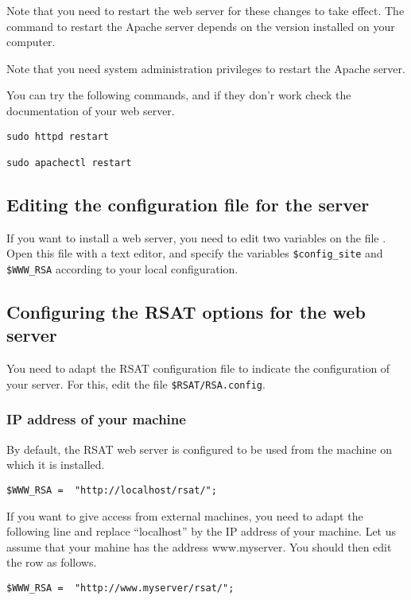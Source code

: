 \documentclass[12pt,a4paper, twoside]{scrreprt} %
\begin{document}
Note that you need to restart the web server for these changes to take
effect. The command to restart the Apache server depends on the
version installed on your computer. 

Note that you need system administration privileges to restart the
Apache server.

You can try the following commands, and if they don'r work check the
documentation of your web server.

\begin{lstlisting}
sudo httpd restart

sudo apachectl restart
\end{lstlisting}

\subsection{Editing the configuration file for the \RSAT server}

If you want to install a web server, you need to edit two variables on
the file . Open this file with a text editor, and
specify the variables \texttt{\$config\_site} and \texttt{\$WWW\_RSA}
according to your local configuration.


\subsection{Configuring the RSAT options for the web server}

You need to adapt the RSAT configuration file to indicate the
configuration of your server. For this, edit the file
\texttt{\$RSAT/RSA.config}.

\subsubsection{IP address of your machine}

By default, the RSAT web server is configured to be used from the
machine on which it is installed. 

\begin{lstlisting}
$WWW_RSA = 	"http://localhost/rsat/";
\end{lstlisting}

If you want to give access from external machines, you need to adapt
the following line and replace ``localhost'' by the IP address of your
machine. Let us assume that your mahine has the address
www.myserver. You should then edit the row as follows.

\begin{lstlisting}
$WWW_RSA = 	"http://www.myserver/rsat/";
\end{lstlisting}
\end{document}
